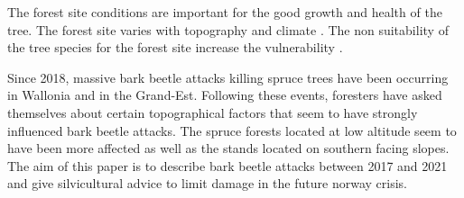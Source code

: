 \documentclass[3p,procedia]{elsarticle}
\begin{document}
 


The forest site conditions are important for the good growth and health of the tree.
The forest site varies with topography and climate \citep{brethes_typologie_1989}.
The non suitability of the tree species for the forest site increase the vulnerability \citep{jandl_climate-induced_2020}.

Since 2018, massive bark beetle attacks killing spruce trees have been occurring in Wallonia and in the Grand-Est. Following these events, foresters have asked themselves about certain topographical factors that seem to have strongly influenced bark beetle attacks. 
The spruce forests located at low altitude seem to have been more affected as well as the stands located on southern facing slopes.
The aim of this paper is to describe bark beetle attacks between 2017 and 2021 and give silvicultural advice to limit damage in the future norway crisis.  









\end{document}
